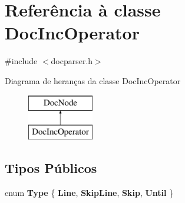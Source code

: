 \hypertarget{class_doc_inc_operator}{\section{Referência à classe Doc\-Inc\-Operator}
\label{class_doc_inc_operator}
}


{\ttfamily \#include $<$docparser.\-h$>$}

Diagrama de heranças da classe Doc\-Inc\-Operator\begin{figure}[H]
\begin{center}
\leavevmode
\includegraphics[height=2.000000cm]{class_doc_inc_operator}
\end{center}
\end{figure}
\subsection*{Tipos Públicos}
\begin{DoxyCompactItemize}
\item 
enum {\bfseries Type} \{ {\bfseries Line}, 
{\bfseries Skip\-Line}, 
{\bfseries Skip}, 
{\bfseries Until}
 \}
\end{DoxyCompactItemize}
